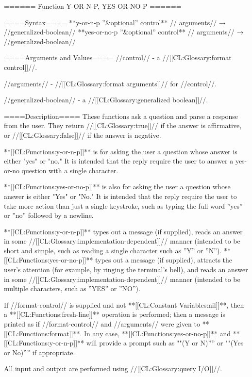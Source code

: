 ====== Function Y-OR-N-P, YES-OR-NO-P ======

====Syntax====
**{y-or-n-p} {''&optional'' control** //\rest} arguments// → //generalized-boolean// **{yes-or-no-p} {''&optional'' control** //\rest} arguments// → //generalized-boolean//

====Arguments and Values====
//control// - a //[[CL:Glossary:format control]]//.

//arguments// - //[[CL:Glossary:format arguments]]// for //control//.

//generalized-boolean// - a //[[CL:Glossary:generalized boolean]]//.

====Description====
These functions ask a question and parse a response from the user. They return //[[CL:Glossary:true]]// if the answer is affirmative, or //[[CL:Glossary:false]]// if the answer is negative.

**[[CL:Functions:y-or-n-p]]** is for asking the user a question whose answer is either "yes" or "no." It is intended that the reply require the user to answer a yes-or-no question with a single character.

**[[CL:Functions:yes-or-no-p]]** is also for asking the user a question whose answer is either "Yes" or "No." It is intended that the reply require the user to take more action than just a single keystroke, such as typing the full word ''yes'' or ''no'' followed by a newline.

**[[CL:Functions:y-or-n-p]]** types out a message (if supplied), reads an answer in some //[[CL:Glossary:implementation-dependent]]// manner (intended to be short and simple, such as reading a single character such as ''Y'' or ''N''). **[[CL:Functions:yes-or-no-p]]** types out a message (if supplied), attracts the user's attention (for example, by ringing the terminal's bell), and reads an answer in some //[[CL:Glossary:implementation-dependent]]// manner (intended to be multiple characters, such as ''YES'' or ''NO'').

If //format-control// is supplied and not **[[CL:Constant Variables:nil]]**, then a **[[CL:Functions:fresh-line]]** operation is performed; then a message is printed as if //format-control// and //arguments// were given to **[[CL:Functions:format]]**. In any case, **[[CL:Functions:yes-or-no-p]]** and **[[CL:Functions:y-or-n-p]]** will provide a prompt such as ""(Y or N)'''' or ""(Yes or No)'''' if appropriate.

All input and output are performed using //[[CL:Glossary:query I/O]]//.

